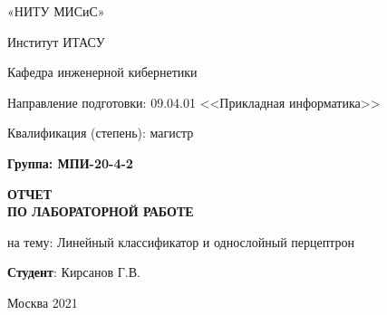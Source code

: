 \begin{titlepage}
	\newpage
	\begin{center}
		\large
		«НИТУ МИСиС»

		\hrulefill
	\end{center}
	Институт ИТАСУ

	\noindent Кафедра инженерной кибернетики

	\noindent Направление подготовки: 09.04.01 <<Прикладная информатика>>

	\noindent Квалификация (степень): магистр

	\noindent \textbf{Группа: МПИ-20-4-2}

	\vspace{9.5em}

	\begin{center}
		\Large{\textsc{\textbf{ОТЧЕТ\\ПО ЛАБОРАТОРНОЙ РАБОТЕ }}}

		\large
		на тему: Линейный классификатор и однослойный перцептрон

	\end{center}

	\vspace{6em}

	\begin{flushleft}
		\textbf{Студент}: Кирсанов Г.В.
	\end{flushleft}

	\vspace{\fill}

	\begin{center}
		Москва 2021
	\end{center}

	\begin{center}
		\hrulefill
	\end{center}
\end{titlepage}